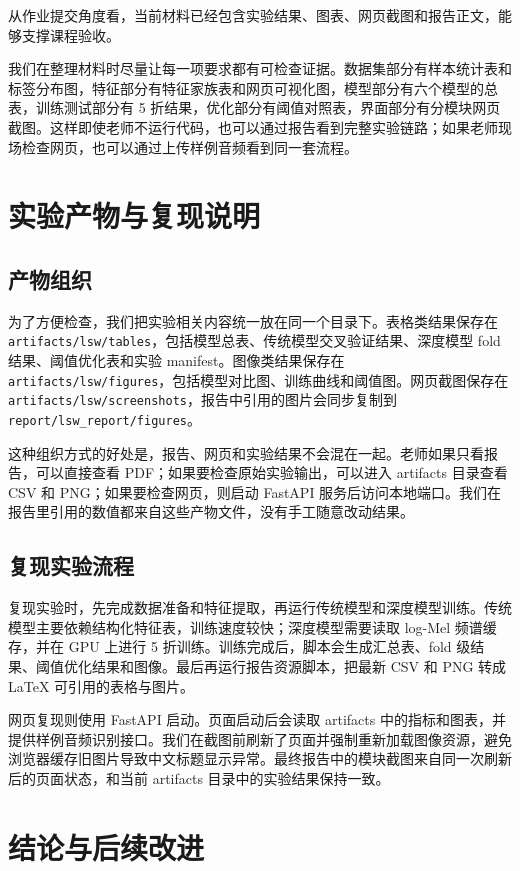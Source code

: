 \documentclass[12pt,a4paper]{article}
\begin{document}
从作业提交角度看，当前材料已经包含实验结果、图表、网页截图和报告正文，能够支撑课程验收。

我们在整理材料时尽量让每一项要求都有可检查证据。数据集部分有样本统计表和标签分布图，特征部分有特征家族表和网页可视化图，模型部分有六个模型的总表，训练测试部分有 5 折结果，优化部分有阈值对照表，界面部分有分模块网页截图。这样即使老师不运行代码，也可以通过报告看到完整实验链路；如果老师现场检查网页，也可以通过上传样例音频看到同一套流程。

\section{实验产物与复现说明}

\subsection{产物组织}
为了方便检查，我们把实验相关内容统一放在同一个目录下。表格类结果保存在 \texttt{artifacts/lsw/tables}，包括模型总表、传统模型交叉验证结果、深度模型 fold 结果、阈值优化表和实验 manifest。图像类结果保存在 \texttt{artifacts/lsw/figures}，包括模型对比图、训练曲线和阈值图。网页截图保存在 \texttt{artifacts/lsw/screenshots}，报告中引用的图片会同步复制到 \texttt{report/lsw\_report/figures}。

这种组织方式的好处是，报告、网页和实验结果不会混在一起。老师如果只看报告，可以直接查看 PDF；如果要检查原始实验输出，可以进入 artifacts 目录查看 CSV 和 PNG；如果要检查网页，则启动 FastAPI 服务后访问本地端口。我们在报告里引用的数值都来自这些产物文件，没有手工随意改动结果。

\subsection{复现实验流程}
复现实验时，先完成数据准备和特征提取，再运行传统模型和深度模型训练。传统模型主要依赖结构化特征表，训练速度较快；深度模型需要读取 log-Mel 频谱缓存，并在 GPU 上进行 5 折训练。训练完成后，脚本会生成汇总表、fold 级结果、阈值优化结果和图像。最后再运行报告资源脚本，把最新 CSV 和 PNG 转成 LaTeX 可引用的表格与图片。

网页复现则使用 FastAPI 启动。页面启动后会读取 artifacts 中的指标和图表，并提供样例音频识别接口。我们在截图前刷新了页面并强制重新加载图像资源，避免浏览器缓存旧图片导致中文标题显示异常。最终报告中的模块截图来自同一次刷新后的页面状态，和当前 artifacts 目录中的实验结果保持一致。

\section{结论与后续改进}
\end{document}
